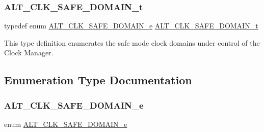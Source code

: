 \subsubsection{\texorpdfstring{ALT\_CLK\_SAFE\_DOMAIN\_t}{ALT\_CLK\_SAFE\_DOMAIN\_t}}
{\footnotesize\ttfamily typedef enum \mbox{\hyperlink{group__CLK__MGR__SAFE__MODE_ga8feb75a3bd96f3d639ed8052133c9029}{A\+L\+T\+\_\+\+C\+L\+K\+\_\+\+S\+A\+F\+E\+\_\+\+D\+O\+M\+A\+I\+N\+\_\+e}}  \mbox{\hyperlink{group__CLK__MGR__SAFE__MODE_gacf9924b29261719c075137e2805f8d3f}{A\+L\+T\+\_\+\+C\+L\+K\+\_\+\+S\+A\+F\+E\+\_\+\+D\+O\+M\+A\+I\+N\+\_\+t}}}

This type definition enumerates the safe mode clock domains under control of the Clock Manager. 

\subsection{Enumeration Type Documentation}
\mbox{\label{group__CLK__MGR__SAFE__MODE_ga8feb75a3bd96f3d639ed8052133c9029}} 
\subsubsection{\texorpdfstring{ALT\_CLK\_SAFE\_DOMAIN\_e}{ALT\_CLK\_SAFE\_DOMAIN\_e}}
{\footnotesize\ttfamily enum \mbox{\hyperlink{group__CLK__MGR__SAFE__MODE_ga8feb75a3bd96f3d639ed8052133c9029}{A\+L\+T\+\_\+\+C\+L\+K\+\_\+\+S\+A\+F\+E\+\_\+\+D\+O\+M\+A\+I\+N\+\_\+e}}}


